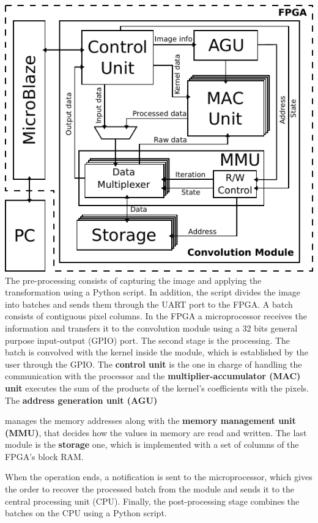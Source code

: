 \documentclass[a1paper,portrait,fontscale=0.43]{baposter}
\begin{document}
\begin{poster}
{%

\begin{multicols}{2}
    \includegraphics[width=\linewidth]{general}
\vfill\null
\columnbreak
The pre-processing consists of capturing the image and applying
the transformation using a Python script. In addition, the script divides the
image into batches and sends them through the UART port to the FPGA. A batch
consists of contiguous pixel columns. In the FPGA a microprocessor receives the
information and transfers it to the convolution module using a 32 bits general
purpose input-output (GPIO) port. The second stage is the processing. The batch is convolved with the kernel inside
the module, which is established by the user through the GPIO.
The \textbf{control unit} is the one in charge of handling the communication with
the processor and the \textbf{multiplier-accumulator (MAC) unit} executes the sum
of the products of the kernel's coefficients with the pixels. The \textbf{address generation unit (AGU)}
\end{multicols}
manages the memory addresses along with
the \textbf{memory management unit (MMU)}, that decides how the values in memory
are read and written.
The last module is the \textbf{storage} one, which is
implemented with a set of columns of the FPGA's block RAM. 

When the operation ends, a notification is sent to the microprocessor,
which gives the order to recover the processed batch from the module and sends it
to the central processing unit (CPU). Finally, the post-processing stage combines
the batches on the CPU using a Python script.
}


\end{poster}
\end{document}
